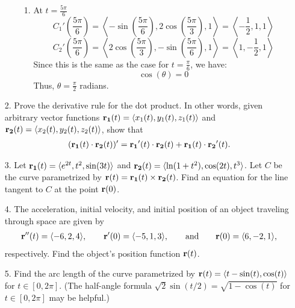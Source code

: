 \documentclass[reqno, 12pt]{amsart}
\begin{document}
\begin{itemize}
\begin{itemize}
\begin{answerbox}
\begin{enumerate}
            \item At \( t = \frac{5\pi}{6} \)
              \[
                C_1'\left(\frac{5\pi}{6}\right) = \left\langle -\sin\left(\frac{5\pi}{6}\right), 2\cos\left(\frac{5\pi}{3}\right), 1 \right\rangle = \left\langle -\frac{1}{2}, 1, 1 \right\rangle
              \]
              \[
                C_2'\left(\frac{5\pi}{6}\right) = \left\langle 2\cos\left(\frac{5\pi}{3}\right), -\sin\left(\frac{5\pi}{6}\right), 1 \right\rangle = \left\langle 1, -\frac{1}{2}, 1 \right\rangle
              \]
              Since this is the same as the case for \( t = \frac{\pi}{6} \), we have:
              \[
                \cos(\theta) = 0
              \]
              Thus, \( \theta = \frac{\pi}{2} \) radians.
          \end{enumerate}
        \end{answerbox}
        \vspace{0.5 in}
    \end{itemize}

  \item[2.] Prove the derivative rule for the dot product. In other words, given arbitrary vector functions ${\bf r_1}(t) = \langle x_1(t), y_1(t), z_1(t)\rangle$ and ${\bf r_2}(t) = \langle x_2(t), y_2(t), z_2(t)\rangle$, show that
    \begin{align*}
      ({\bf r_1}(t)\cdot{\bf r_2}(t))' = {\bf r_1}'(t)\cdot{\bf r_2}(t) + {\bf r_1}(t)\cdot{\bf r_2}'(t).
    \end{align*}

    \newpage
  \item[3.] Let ${\bf r_1}(t) = \langle e^{2t}, t^2, \sin(3t)\rangle$ and ${\bf r_2}(t) = \langle \ln(1+t^2), \cos(2t), t^3\rangle$. Let $C$ be the curve parametrized by ${\bf r}(t) = {\bf r_1}(t) \times {\bf r_2}(t)$. Find an equation for the line tangent to $C$ at the point ${\bf r}(0)$.

    \newpage
  \item[4.] The acceleration, initial velocity, and initial position of an object traveling through space are given by
    \begin{align*}
      {\bf r}''(t) = \langle -6,2,4\rangle, \quad\quad {\bf r}'(0) = \langle -5,1,3\rangle, \quad\quad\text{and}\quad\quad {\bf r}(0) = \langle 6,-2,1\rangle,
    \end{align*}
    respectively. Find the object's position function ${\bf r}(t)$.

    \newpage
  \item[5.] Find the arc length of the curve parametrized by ${\bf r}(t) = \langle t-\sin(t), \cos(t)\rangle$ for $t \in [0,2\pi]$. (The half-angle formula $\sqrt{2}\sin(t/2) = \sqrt{1-\cos(t)}$ for $t \in [0,2\pi]$ may be helpful.)


\end{itemize}
\end{document}
